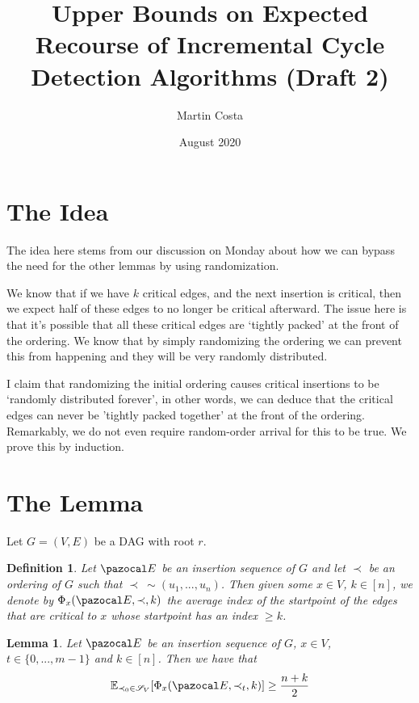 \documentclass{article}
\title{Upper Bounds on Expected Recourse of Incremental Cycle Detection Algorithms (Draft 2)}
\author{Martin Costa}
\date{August 2020}
\newtheorem{lemma}{Lemma}
\newtheorem{corollary}{Corollary}
\newtheorem{definition}{Definition}
\begin{document}
\section{The Idea}

The idea here stems from our discussion on Monday about how we can bypass the need for the other lemmas by using randomization.

We know that if we have $k$ critical edges, and the next insertion is critical, then we expect half of these edges to no longer be critical afterward. The issue here is that it's possible that all these critical edges are `tightly packed' at the front of the ordering. We know that by simply randomizing the ordering we can prevent this from happening and they will be very randomly distributed.

I claim that randomizing the initial ordering causes critical insertions to be `randomly distributed forever', in other words, we can deduce that the critical edges can never be 'tightly packed together' at the front of the ordering. Remarkably, we do not even require random-order arrival for this to be true. We prove this by induction.

\section{The Lemma}

Let $G=(V,E)$ be a DAG with root $r$. 

\begin{definition} Let $\pazocal E$ be an insertion sequence of $G$ and let $\prec$ be an ordering of $G$ such that $\prec \: \sim (u_1,...,u_n)$. Then given some $x \in V$, $k \in [n]$, we denote by $\Phi_x(\pazocal E, \prec, k)$ the average index of the startpoint of the edges that are critical to $x$ whose startpoint has an index $\geq k$.
\end{definition}

\begin{lemma} Let $\pazocal E$ be an insertion sequence of $G$, $x \in V$, $t \in \{0,...,m-1\}$ and $k \in [n]$. Then we have that
\[ \mathbb E_{\prec_0 \in \mathcal S_V}[\Phi_x(\pazocal E, \prec_t, k)] \geq \frac{n+k}{2} \]
\end{lemma}


\end{document}
